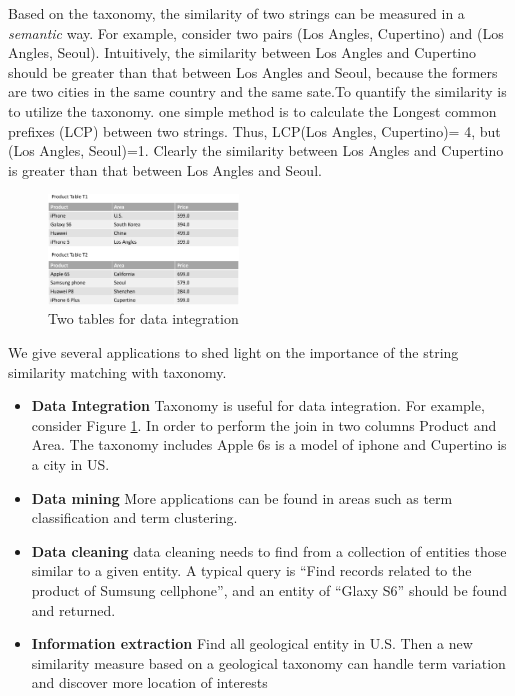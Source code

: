 Based on the taxonomy,  the similarity of two strings can be measured in a \textit{semantic} way. For example, consider two pairs (Los Angles, Cupertino) and (Los Angles, Seoul). Intuitively, the similarity between Los Angles and Cupertino should be greater than that between Los Angles and Seoul, because the formers are two cities in the same country and the same sate.To quantify the similarity is to utilize the taxonomy. one simple method is to calculate the Longest common prefixes (LCP) between two strings. Thus, LCP(Los Angles, Cupertino)= 4, but (Los Angles, Seoul)=1. Clearly the similarity between Los Angles and Cupertino is greater than that between Los Angles and Seoul.


\begin{figure}[t]
\centering
\includegraphics[width=0.45\textwidth]{figures/productexample}
 \caption{Two tables for data integration}
\label{fig:twotables}
\end{figure}

We give several applications to shed light on the importance of the  string similarity matching with taxonomy.

\begin{itemize}
  \item \textbf{Data Integration} Taxonomy is useful for data integration. For example, consider Figure \ref{fig:twotables}. In order to perform the join in two columns Product and Area. The taxonomy includes Apple 6s is a model of iphone and Cupertino is a city in US.
  \item \textbf{Data mining} More applications can be found in areas such as term classification and term clustering.
  \item \textbf{Data cleaning} data cleaning needs to find from a collection of entities those similar to a given entity. A typical query is ``Find records related to the product of Sumsung cellphone'', and an entity of ``Glaxy S6'' should be found and returned.
  \item \textbf{Information extraction} Find all geological entity in U.S. Then a new similarity measure based on a geological taxonomy can handle term variation and discover more location of interests
\end{itemize}




